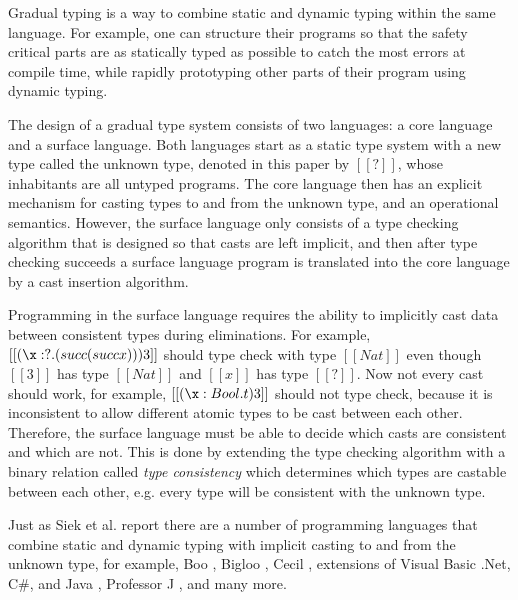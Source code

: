 
Gradual typing \cite{Siek:2006,Siek:2015} is a way to combine static
and dynamic typing within the same language.  For example, one can
structure their programs so that the safety critical parts are as
statically typed as possible to catch the most errors at compile time,
while rapidly prototyping other parts of their program using dynamic
typing.

The design of a gradual type system consists of two languages: a core
language and a surface language.  Both languages start as a static
type system with a new type called the unknown type, denoted in this
paper by $[[?]]$, whose inhabitants are all untyped programs.  The
core language then has an explicit mechanism for casting types to and
from the unknown type, and an operational semantics.  However, the
surface language only consists of a type checking algorithm that is
designed so that casts are left implicit, and then after type checking
succeeds a surface language program is translated into the core
language by a cast insertion algorithm.

Programming in the surface language requires the ability to implicitly
cast data between consistent types during eliminations. For example,
$[[(\x:?.(succ (succ x))) 3]]$ should type check with type $[[Nat]]$
even though $[[3]]$ has type $[[Nat]]$ and $[[x]]$ has type
$[[?]]$. Now not every cast should work, for example, $[[(\x:Bool.t)
    3]]$ should not type check, because it is inconsistent to allow
different atomic types to be cast between each other.  Therefore, the
surface language must be able to decide which casts are consistent and
which are not.  This is done by extending the type checking algorithm
with a binary relation called \emph{type consistency} which determines
which types are castable between each other, e.g. every type will be
consistent with the unknown type.

Just as Siek et al. report \cite{Siek:2006,Siek:2007,Siek:2015} there
are a number of programming languages that combine static and dynamic
typing with implicit casting to and from the unknown type, for
example, Boo \cite{?}, Bigloo \cite{?,?}, Cecil \cite{?}, extensions
of Visual Basic .Net, C\#, and Java \cite{?,?}, Professor J \cite{?},
and many more.

